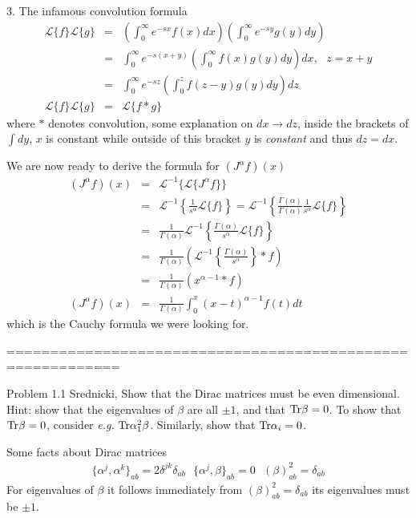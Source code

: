 \documentclass[aps,preprint,preprintnumbers,nofootinbib,showpacs,prd]{revtex4-1}
\newcommand{\eg}{{\it e.g.} }
\newcommand{\nbea}{\begin{eqnarray*}}
\newcommand{\neea}{\end{eqnarray*}}
\begin{document}
3. The infamous convolution formula 
\nbea
\mathcal{L}\{f\}\mathcal{L}\{g\} & = & \left (\int_0^\infty e^{-sx} f(x) dx\right )\left (\int_0^\infty e^{-sy} g(y) dy\right ) \\
& = & \int_0^\infty e^{-s(x+y)}  \left ( \int_0^{\infty} f(x) g(y) dy \right ) dx, ~~~ z = x + y \\
& = & \int_0^\infty e^{-s z} \left ( \int_0^{z} f(z-y) g(y) dy \right ) dz \\
\mathcal{L}\{f\}\mathcal{L}\{g\} & = & \mathcal{L} \{ f * g\}
\neea
where $*$ denotes convolution, some explanation on $dx \rightarrow dz$, inside the brackets of $\int dy$, $x$ is constant while outside of this bracket $y$ is {\it constant} and thus $dz = dx$.
 
We are now ready to derive the formula for $(J^\alpha f)(x)$
\nbea
(J^\alpha f)(x) & = & \mathcal{L}^{-1} \{ \mathcal{L} \{J^\alpha f\} \} \\
& = & \mathcal{L}^{-1} \left \{ \frac{1}{s^\alpha} \mathcal{L} \{ f\} \right \} = \mathcal{L}^{-1} \left \{ \frac{\Gamma(\alpha)}{\Gamma(\alpha)}\frac{1}{s^\alpha} \mathcal{L} \{ f\} \right \} \\
& = & \frac{1}{\Gamma(\alpha)}\mathcal{L}^{-1} \left \{ \frac{\Gamma(\alpha)}{s^\alpha} \mathcal{L} \{ f\} \right \} \\
& = & \frac{1}{\Gamma(\alpha)} \left ( \mathcal{L}^{-1} \left \{ \frac{\Gamma(\alpha)}{s^\alpha} \right \} *  f \right ) \\
& = & \frac{1}{\Gamma(\alpha)} \left ( x^{\alpha-1} *  f \right ) \\
(J^\alpha f)(x) & = & \frac{1}{\Gamma(\alpha)} \int_0^x ( x - t )^{\alpha-1}  f(t) dt 
\neea
which is the Cauchy formula we were looking for.

===========================================================

Problem 1.1 Srednicki, Show that the Dirac matrices must be even dimensional. Hint: show that the eigenvalues of $\beta$ are all $\pm 1$, and that ${\rm Tr} \beta = 0$. To show that ${\rm Tr} \beta = 0$, consider \eg ${\rm Tr} \alpha_1^2 \beta$. Similarly, show that ${\rm Tr} \alpha_i = 0$.

Some facts about Dirac matrices
%
\nbea
\{ \alpha^j, \alpha^k\}_{ab} = 2\delta^{jk}\delta_{ab} ~~~ \{ \alpha^j, \beta\}_{ab} = 0 ~~~ (\beta)^2_{ab} = \delta_{ab}
\neea
%
For eigenvalues of $\beta$ it follows immediately from $(\beta)^2_{ab} = \delta_{ab}$ its eigenvalues must be $\pm 1$.
\end{document}
